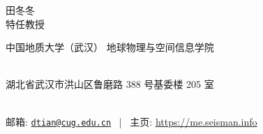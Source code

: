 \documentclass[11pt, a4paper]{article}
\makeatletter
\newcommand{\MyName}{田冬冬}
\newcommand{\MyRole}{特任教授}
\newcommand{\Email}{dtian@cug.edu.cn}
\newcommand{\Website}{https://me.seisman.info}
\newcommand{\Affiliation}{
	中国地质大学（武汉）\hspace{0.2cm} 地球物理与空间信息学院
}
\newcommand{\Address}{
	湖北省武汉市洪山区鲁磨路 388 号基委楼 205 室
}
\newcommand{\makefield}[2]{\makebox[1.5em]{\color{MarkerColour!80!black}#1} #2}
\makeatother
\begin{document}
\thispagestyle{empty}

\begin{center}
    {\fontsize{30pt}{0}\selectfont \MyName}
    \\[0.5cm]
    {\fontsize{18pt}{0}\selectfont \MyRole}
    \\[0.3cm]
    {\fontsize{11pt}{0}\selectfont
        \Affiliation
        \\[0.2cm]
        \Address
        \\[0.08cm]
        邮箱: \href{mailto:\Email}{\texttt{\Email}}
        \, | \,
        主页: \url{\Website}
    }
\end{center}











\end{document}
